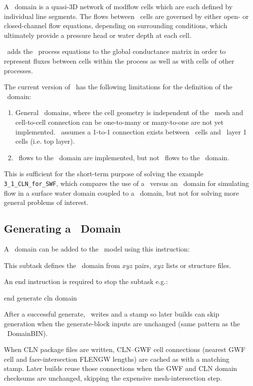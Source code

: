 \label{texfile:CLN}
A \cln\ domain is a quasi-3D network of modflow cells which are each defined by individual line segments. The flows between \cln\ cells are governed by either open- or closed-channel flow equations, depending on surrounding conditions, which ultimately provide a pressure head or water depth at each cell.

\mut\ adds the \cln\ process equations to the global
conductance matrix in order to represent fluxes between cells
within the process as well as with cells of other processes.

The current version of \mut\ has the following limitations for the definition of the \cln\ domain:
\begin{enumerate}
    \item General \cln\ domains, where the cell geometry is independent of the \gwf\ mesh and  cell-to-cell connection can be one-to-many or many-to-one are not yet implemented. \mut\ assumes a 1-to-1 connection exists between \cln\ cells and \gwf\ layer 1 cells (i.e. top layer).
    \item \cln\ flows to the \gwf\ domain are implemented, but not  \cln\ flows to the \swf\ domain.
\end{enumerate}

This is sufficient for the short-term purpose of solving the example \texttt{3\_1\_CLN\_for\_SWF}, which compares the use of a \cln\ versus an \swf\ domain for simulating flow in a surface water domain coupled to a \gwf\ domain, but not for solving more general problems of interest.

\subsection{Generating a \cln\ Domain}
A \cln\ domain can be added to the \mfus\ model using this instruction:

    {This subtask defines the \cln\ domain from $xyz$ pairs, $xyz$ lists or structure files.

    An end instruction is required to stop the subtask e.g.:

    {\Large \sf end generate cln domain}

    After a successful generate, \mut\ writes  and a  stamp so later builds can skip generation when the generate-block inputs are unchanged (same pattern as the \gwf\ DomainBIN).

    When CLN package files are written, CLN--GWF cell connections (nearest GWF cell and face-intersection FLENGW lengths) are cached as  with a matching  stamp. Later builds reuse those connections when the GWF and CLN domain checksums are unchanged, skipping the expensive mesh-intersection step.
    }

